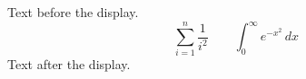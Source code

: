 \documentclass{article}
\begin{document}
Text before the display.
\[
  \sum_{i=1}^{n} \frac{1}{i^2} \qquad \int_{0}^{\infty} e^{-x^2}\,dx
\]
Text after the display.
\end{document}
